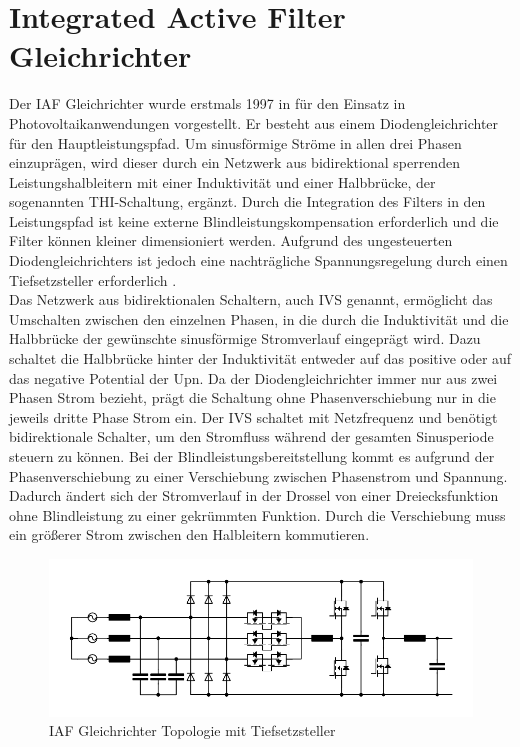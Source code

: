 \section{Integrated Active Filter Gleichrichter}
	Der \gls{IAF} Gleichrichter wurde erstmals 1997 in \cite{IAFfirst} für den Einsatz in Photovoltaikanwendungen vorgestellt. Er besteht aus einem Diodengleichrichter für den Hauptleistungspfad. Um sinusförmige Ströme in allen drei Phasen einzuprägen, wird dieser durch ein Netzwerk aus bidirektional sperrenden Leistungshalbleitern mit einer Induktivität und einer Halbbrücke, der sogenannten THI-Schaltung, ergänzt. Durch die Integration des Filters in den Leistungspfad ist keine externe Blindleistungskompensation erforderlich und die Filter können kleiner dimensioniert werden. Aufgrund des ungesteuerten Diodengleichrichters ist jedoch eine nachträgliche Spannungsregelung durch einen Tiefsetzsteller erforderlich \cite{ThesisSchrittwieserBuckTypePFC_2017}.\\
	Das Netzwerk aus bidirektionalen Schaltern, auch \gls{IVS} genannt, ermöglicht das Umschalten zwischen den einzelnen Phasen, in die durch die Induktivität und die Halbbrücke der gewünschte sinusförmige Stromverlauf eingeprägt wird. Dazu schaltet die Halbbrücke hinter der Induktivität entweder auf das positive oder auf das negative Potential der \gls{Upn}. Da der Diodengleichrichter immer nur aus zwei Phasen Strom bezieht, prägt die Schaltung ohne Phasenverschiebung nur in die jeweils dritte Phase Strom ein. Der \gls{IVS} schaltet mit Netzfrequenz und benötigt bidirektionale Schalter, um den Stromfluss während der gesamten Sinusperiode steuern zu können. Bei der Blindleistungsbereitstellung kommt es aufgrund der Phasenverschiebung zu einer Verschiebung zwischen Phasenstrom und Spannung. Dadurch ändert sich der Stromverlauf in der Drossel von einer Dreiecksfunktion ohne Blindleistung zu einer gekrümmten Funktion. Durch die Verschiebung muss ein größerer Strom zwischen den Halbleitern kommutieren. 
	\begin{figure}
		\centering
		\includegraphics[width=0.9\linewidth]{content/Grafiken/IAF}
		\caption[\gls{IAF} Gleichrichter Topologie]{\gls{IAF} Gleichrichter Topologie mit Tiefsetzsteller}
		\label{fig:iaf}
	\end{figure}



